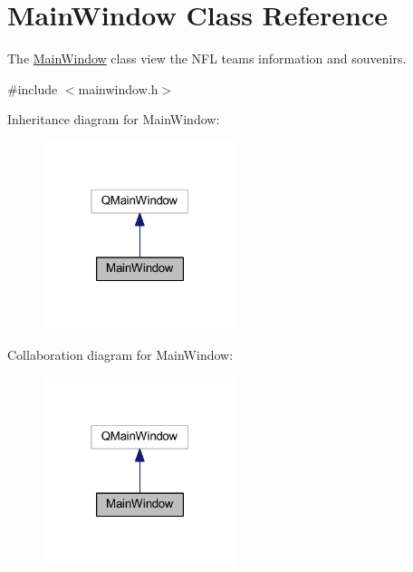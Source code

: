 \hypertarget{class_main_window}{}\section{Main\+Window Class Reference}
\label{class_main_window}


The \hyperlink{class_main_window}{Main\+Window} class view the N\+FL teams information and souvenirs.  




{\ttfamily \#include $<$mainwindow.\+h$>$}



Inheritance diagram for Main\+Window\+:
\nopagebreak
\begin{figure}[H]
\begin{center}
\leavevmode
\includegraphics[width=160pt]{class_main_window__inherit__graph}
\end{center}
\end{figure}


Collaboration diagram for Main\+Window\+:
\nopagebreak
\begin{figure}[H]
\begin{center}
\leavevmode
\includegraphics[width=160pt]{class_main_window__coll__graph}
\end{center}
\end{figure}
